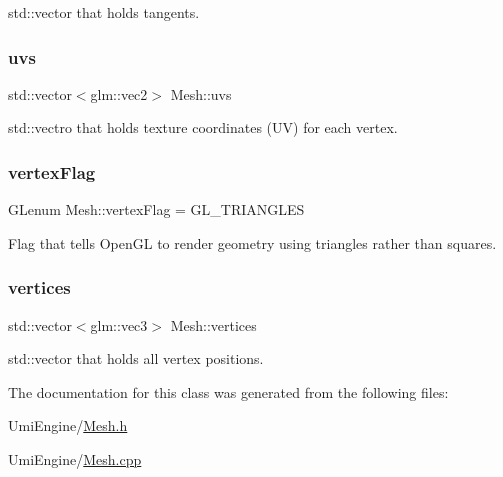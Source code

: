 std\+::vector that holds tangents. 

\mbox{\label{class_mesh_af98b594a339f9e92ed0a4e1e4d84a6d9}} 
\subsubsection{\texorpdfstring{uvs}{uvs}}
{\footnotesize\ttfamily std\+::vector$<$glm\+::vec2$>$ Mesh\+::uvs}



std\+::vectro that holds texture coordinates (UV) for each vertex. 

\mbox{\label{class_mesh_aa4fa174a34713f4f3286bd202d5d3617}} 
\subsubsection{\texorpdfstring{vertexFlag}{vertexFlag}}
{\footnotesize\ttfamily G\+Lenum Mesh\+::vertex\+Flag = G\+L\+\_\+\+T\+R\+I\+A\+N\+G\+L\+ES}



Flag that tells Open\+GL to render geometry using triangles rather than squares. 

\mbox{\label{class_mesh_aee572fab7113a18cf174a8418394aef4}} 
\subsubsection{\texorpdfstring{vertices}{vertices}}
{\footnotesize\ttfamily std\+::vector$<$glm\+::vec3$>$ Mesh\+::vertices}



std\+::vector that holds all vertex positions. 



The documentation for this class was generated from the following files\+:\begin{DoxyCompactItemize}
\item 
Umi\+Engine/\mbox{\hyperlink{_mesh_8h}{Mesh.\+h}}\item 
Umi\+Engine/\mbox{\hyperlink{_mesh_8cpp}{Mesh.\+cpp}}\end{DoxyCompactItemize}
